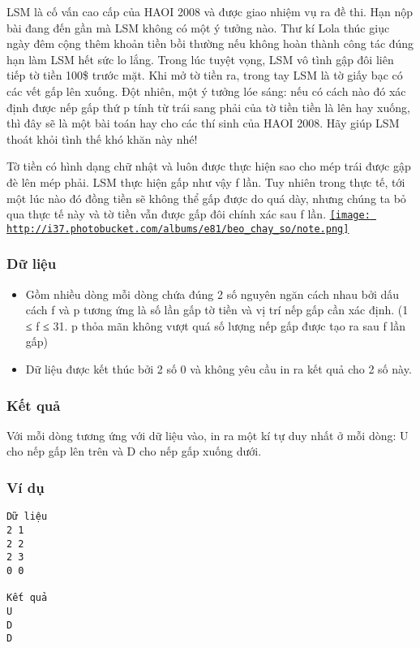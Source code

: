 



   LSM là cố vấn cao cấp của HAOI 2008 và được giao nhiệm vụ ra đề thi. Hạn nộp bài đang đến gần mà LSM không có một ý tưởng nào. Thư kí Lola thúc giục ngày đêm cộng thêm khoản tiền bồi thường nếu không hoàn thành công tác đúng hạn làm LSM hết sức lo lắng. Trong lúc tuyệt vọng, LSM vô tình gập đôi liên tiếp tờ tiền 100\$ trước mặt. Khi mở tờ tiền ra, trong tay LSM là tờ giấy bạc có các vết gấp lên xuống. Đột nhiên, một ý tưởng lóe sáng: nếu có cách nào đó xác định được nếp gấp thứ p tính từ trái sang phải của tờ tiền tiền là lên hay xuống, thì đây sẽ là một bài toán hay cho các thí sinh của HAOI 2008. Hãy giúp LSM thoát khỏi tình thế khó khăn này nhé!  

   Tờ tiền có hình dạng chữ nhật và luôn được thực hiện sao cho mép trái được gập đè lên mép phải. LSM thực hiện gấp như vậy f lần. Tuy nhiên trong thực tế, tới một lúc nào đó đồng tiền sẽ không thể gấp được do quá dày, nhưng chúng ta bỏ qua thực tế này và tờ tiền vẫn được gấp đôi chính xác sau f lần.  \href{http://s37.photobucket.com/albums/e81/beo_chay_so/?action=view&amp;current=note.png}{
\texttt{[image: http://i37.photobucket.com/albums/e81/beo\_chay\_so/note.png]}}

\subsubsection{   Dữ liệu  }
\begin{itemize}
	\item     Gồm nhiều dòng mỗi dòng chứa đúng 2 số nguyên ngăn cách nhau bởi dấu cách f và p tương ứng là số lần gấp tờ tiền và vị trí nếp gấp cần xác định. (1 ≤ f ≤ 31. p thỏa mãn không vượt quá số lượng nếp gấp được tạo ra sau f lần gấp)   
	\item     Dữ liệu được kết thúc bởi 2 số 0 và không yêu cầu in ra kết quả cho 2 số này.   
\end{itemize}

\subsubsection{   Kết quả  }

   Với mỗi dòng tương ứng với dữ liệu vào, in ra một kí tự duy nhất ở mỗi dòng: U cho nếp gấp lên trên và D cho nếp gấp xuống dưới.  

\subsubsection{   Ví dụ  }
\begin{verbatim}
Dữ liệu
2 1
2 2
2 3
0 0	

Kết quả
U
D
D
\end{verbatim}